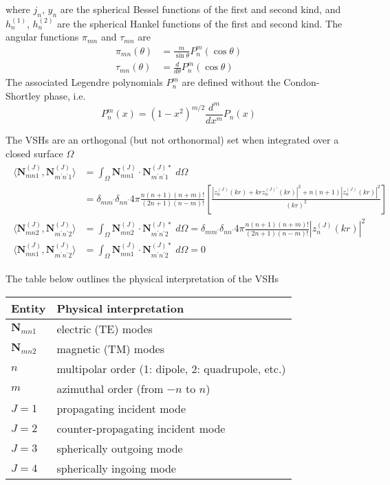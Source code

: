 \documentclass[11pt]{article}
\begin{document}
where $j_n$, $y_n$ are the spherical Bessel functions of the first and second kind, and $h_n^{(1)}$, $h_n^{(2)}$ are the spherical Hankel functions of the first and second kind.
The angular functions $\pi_{mn}$ and $\tau_{mn}$ are
\begin{align}
\pi_{mn}(\theta) &= \frac{m}{\sin\theta} P_n^m(\cos\theta) \\
\tau_{mn}(\theta) &= \frac{d}{d\theta} P_n^m(\cos\theta) 
\end{align}
The associated Legendre polynomials $P_n^m$ are defined without the Condon-Shortley phase, i.e.\
\begin{equation}
P_n^m(x) = (1 - x^2)^{m/2} \frac{d^m}{dx^m} P_n(x)
\end{equation}

The VSHs are an orthogonal (but not orthonormal) set when integrated over a closed surface $\Omega$
\begin{align}
\begin{split}
    \langle \boldsymbol{N}_{mn1}^{(J)}, \boldsymbol{N}_{m^\prime n^\prime 1}^{(J)} \rangle
    &= \int_\Omega \boldsymbol{N}_{mn1}^{(J)} \cdot \boldsymbol{N}_{m^\prime n^\prime 1}^{(J)*} \;d\Omega \\
    &= \delta_{mm^\prime}\delta_{nn^\prime}4\pi \frac{n(n+1)(n+m)!}{(2n+1)(n-m)!}
      \left[ \frac{\left|z_n^{(J)}(kr) + krz_n^{(J)\prime}(kr)\right|^2 + n(n+1) \left|z_n^{(J)}(kr)\right|^2 }{(kr)^2} \right] \\
    \langle \boldsymbol{N}_{mn2}^{(J)}, \boldsymbol{N}_{m^\prime n^\prime 2}^{(J)} \rangle
    &= \int_\Omega \boldsymbol{N}_{mn2}^{(J)} \cdot \boldsymbol{N}_{m^\prime n^\prime 2}^{(J)*} \;d\Omega
    = \delta_{mm^\prime}\delta_{nn^\prime}4\pi \frac{n(n+1)(n+m)!}{(2n+1)(n-m)!} |z_n^{(J)}(kr)|^2 \\
    \langle \boldsymbol{N}_{mn1}^{(J)}, \boldsymbol{N}_{m^\prime n^\prime 2}^{(J)} \rangle
    &= \int_\Omega \boldsymbol{N}_{mn1}^{(J)} \cdot \boldsymbol{N}_{m^\prime n^\prime 2}^{(J)*} \;d\Omega = 0
\end{split}
\end{align}

The table below outlines the physical interpretation of the VSHs
\begin{center}
 \begin{tabular}{|l l|} 
 \hline
 \textbf{Entity} & \textbf{Physical interpretation}  \\ [0.5ex] 
 \hline\hline
 $\bm{N}_{mn1}$ & electric (TE) modes \\ 
 $\bm{N}_{mn2}$ & magnetic (TM) modes \\ 
 \hline
 $n$ & multipolar order (1: dipole, 2: quadrupole, etc.) \\
 $m$ & azimuthal order (from $-n$ to $n$) \\
 \hline
 $J=1$ & propagating incident mode \\ 
 $J=2$ & counter-propagating incident mode \\ 
 $J=3$ & spherically outgoing mode \\ 
 $J=4$ & spherically ingoing mode \\
 \hline
\end{tabular}
\end{center}
\end{document}
